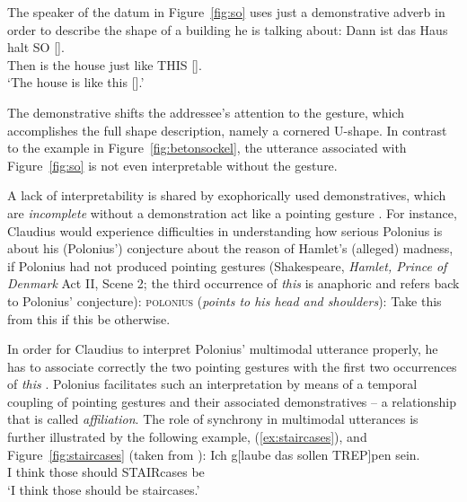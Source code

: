 \documentclass[output=paper]{langsci/langscibook}
\begin{document}
The speaker of the datum in Figure~\ref{fig:so} uses just a demonstrative adverb in order to describe the shape of a building he is talking about:
%
\ea \label{ex:so}
\gll Dann ist das Haus halt {SO} {[]}. \\
     Then is the house just {like THIS} {[]}. \\
\glt \enquote*{The house is like this [].} 
\z

The demonstrative shifts the addressee's attention to the gesture, which accomplishes the full shape description, namely a cornered U-shape.
%
In contrast to the example in Figure~\ref{fig:betonsockel}, the utterance associated with Figure~\ref{fig:so} is not even interpretable without the gesture.


%
%
A lack of interpretability is shared by exophorically used demonstratives, which are \emph{incomplete}  without a demonstration act like a pointing gesture \citep[]{Kaplan:1989:a}.
%
For instance, Claudius would experience difficulties in understanding how serious Polonius is about his (Polonius') conjecture about the reason of Hamlet's (alleged) madness, if Polonius had not produced pointing gestures (Shakespeare,  \textit{Hamlet, Prince of Denmark} Act II, Scene 2; the third occurrence of \textit{this} is anaphoric and refers back to Polonius' conjecture):
%
\ea \label{ex:this}
\textsc{polonius} (\textit{points to his head and shoulders}): 
Take this from this if this be otherwise.
\z

In order for Claudius to interpret Polonius' multimodal utterance properly, he has to associate correctly the two pointing gestures with the first two occurrences of \textit{this} \citep[cf. the problems discussed by][]{Kupffer:2014}. 
%
Polonius facilitates such an interpretation by means of a temporal coupling of pointing gestures and their associated demonstratives -- a relationship that is called \emph{affiliation}.
%
The role of synchrony in multimodal utterances is further illustrated by the following example, (\ref{ex:staircases}), and Figure~\ref{fig:staircases} (taken from \citealp[]{Luecking:2013:a}):
%
\ea \label{ex:staircases}
\gll Ich g[laube das sollen TREP]pen sein.\\
     I think those should STAIRcases be \\
\glt \enquote*{I think those should be staircases.}
\z
\end{document}
